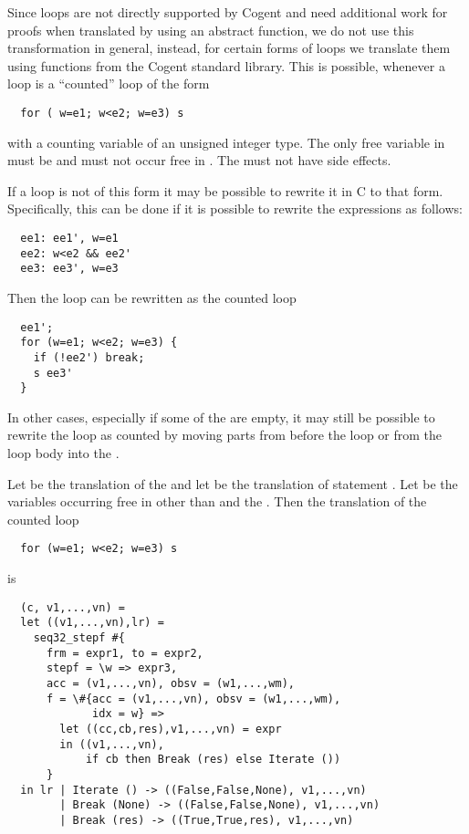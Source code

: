Since  loops are not directly supported by Cogent and need additional work for proofs when translated by using
an abstract function, we do not use this transformation in general, instead, for certain forms of  loops we
translate them using functions from the Cogent standard library. This is possible, whenever a  loop is a 
``counted'' loop of the form
\begin{verbatim}
  for ( w=e1; w<e2; w=e3) s
\end{verbatim}
with a counting variable  of an unsigned integer type. The only free variable in  must be  and
 must not occur free in . The  must not have side effects.

If a  loop is not of this form it may be possible to rewrite it in C to that form. Specifically, this can be done 
if it is possible to rewrite the expressions  as follows:
\begin{verbatim}
  ee1: ee1', w=e1
  ee2: w<e2 && ee2'
  ee3: ee3', w=e3
\end{verbatim}
Then the loop  can be rewritten as the counted loop
\begin{verbatim}
  ee1';
  for (w=e1; w<e2; w=e3) {
    if (!ee2') break;
    s ee3'
  }
\end{verbatim}
In other cases, especially if some of the  are empty, it may still be possible to rewrite the loop as counted by
moving parts from before the loop or from the loop body into the .

Let  be the translation of the  and let  be the translation of 
statement . Let  be the variables occurring free in  other than  and the .
Then the translation of the counted loop 
\begin{verbatim}
  for (w=e1; w<e2; w=e3) s
\end{verbatim}
is
\begin{verbatim}
  (c, v1,...,vn) = 
  let ((v1,...,vn),lr) = 
    seq32_stepf #{
      frm = expr1, to = expr2, 
      stepf = \w => expr3, 
      acc = (v1,...,vn), obsv = (w1,...,wm), 
      f = \#{acc = (v1,...,vn), obsv = (w1,...,wm), 
             idx = w} => 
        let ((cc,cb,res),v1,...,vn) = expr
        in ((v1,...,vn),
            if cb then Break (res) else Iterate ())
      }
  in lr | Iterate () -> ((False,False,None), v1,...,vn)
        | Break (None) -> ((False,False,None), v1,...,vn)
        | Break (res) -> ((True,True,res), v1,...,vn)
\end{verbatim}

